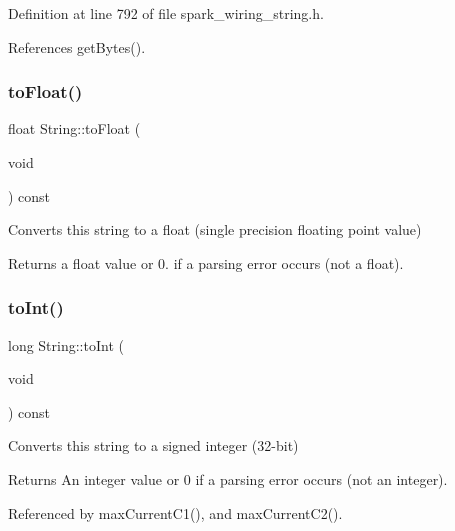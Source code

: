 Definition at line 792 of file spark\+\_\+wiring\+\_\+string.\+h.



References get\+Bytes().

\mbox{\label{class_string_ac501497ce1ba7679e80152eaa71c9986}} 
\subsubsection{\texorpdfstring{to\+Float()}{toFloat()}}
{\footnotesize\ttfamily float String\+::to\+Float (\begin{DoxyParamCaption}\item[{void}]{ }\end{DoxyParamCaption}) const}



Converts this string to a float (single precision floating point value) 

\begin{DoxyReturn}{Returns}
a float value or 0. if a parsing error occurs (not a float). 
\end{DoxyReturn}
\mbox{\label{class_string_a2dc5a9a787f8ff266d1130594ec65237}} 
\subsubsection{\texorpdfstring{to\+Int()}{toInt()}}
{\footnotesize\ttfamily long String\+::to\+Int (\begin{DoxyParamCaption}\item[{void}]{ }\end{DoxyParamCaption}) const}



Converts this string to a signed integer (32-\/bit) 

\begin{DoxyReturn}{Returns}
An integer value or 0 if a parsing error occurs (not an integer). 
\end{DoxyReturn}


Referenced by max\+Current\+C1(), and max\+Current\+C2().

\mbox{\label{class_string_ab281c09b3379e2ab74fa35f619f1d7ad}} 
